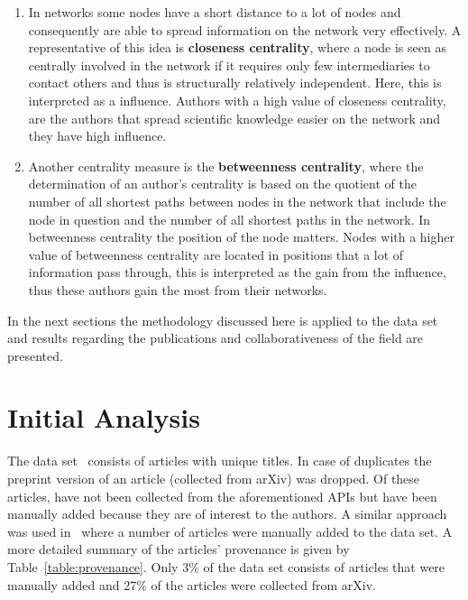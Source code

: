 \documentclass{article}
\theoremstyle{definition}
\newcommand{\totalarticles}{}
\newcommand{\manual}{}
\begin{document}
\begin{enumerate}
    \item In networks some nodes have a short distance to a lot of nodes and
    consequently are able to spread information on the network very effectively.
    A representative of this idea is \textbf{closeness centrality}, where a node
    is seen as centrally involved in the network if it requires only few
    intermediaries to contact others and thus is structurally relatively
    independent. Here, this is interpreted as a influence. Authors with a high
    value of closeness centrality, are the authors that spread scientific
    knowledge easier on the network and they have high influence.
    \item Another centrality measure is the \textbf{betweenness centrality},
    where the determination of an author's centrality is based on the quotient
    of the number of all shortest paths between nodes in the network that
    include the node in question and the number of all shortest paths in the
    network. In betweenness centrality the position of the node matters. Nodes
    with a higher value of betweenness centrality are located in positions that
    a lot of information pass through, this is interpreted as the gain from
    the influence, thus these authors gain the most from their networks.
\end{enumerate}

In the next sections the methodology discussed here is applied to the data
set and results regarding the publications and collaborativeness of the field
are presented.

\section{Initial Analysis}\label{section:results}

The data set~\cite{pd_data_2018} consists of \totalarticles articles with
unique titles. In case of duplicates the preprint version of an article
(collected from arXiv) was dropped. Of these \totalarticles articles, \manual
have not been collected from the aforementioned APIs but have been manually
added because they are of interest to the authors. A similar approach was
used in~\cite{Liu2015} where a number of articles were manually
added to the data set. A more detailed summary of the articles' provenance is
given by Table~\ref{table:provenance}. Only 3\% of the data set consists of
articles that were manually added and 27\% of the articles were collected from
arXiv.
\end{document}
